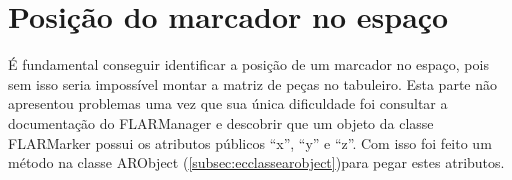 \documentclass[a4paper,12pt]{book}
\begin{document}
		\section{Posi\c c\~ao do marcador no espa\c co}
		\label{sec:pcposicaodomarcadornoespaco}
		\'E fundamental conseguir identificar a posi\c c\~ao de um marcador no espa\c
		co, pois sem isso seria imposs\'ivel montar a matriz de pe\c cas no tabuleiro.
		Esta parte n\~ao apresentou problemas uma vez que sua \'unica dificuldade foi
		consultar a documenta\c c\~ao do FLARManager e descobrir que um objeto da
		classe FLARMarker possui os atributos p\'ublicos ``x'', ``y'' e ``z''. Com
		isso foi feito um m\'etodo na classe ARObject
		(\ref{subsec:ecclassearobject})para pegar estes atributos.
		
\end{document}
